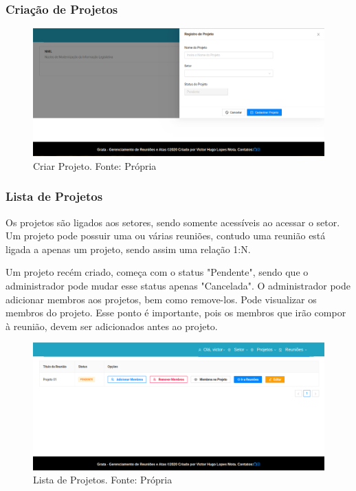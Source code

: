 \subsubsection{Criação de Projetos}

\begin{figure}[H]
    \centering
    \includegraphics[width=1.0\textwidth]{figuras/criar_projeto.png}
    \caption{Criar Projeto. Fonte: Própria}
    \label{img:criacao_de_projeto}
\end{figure}

\subsubsection{Lista de Projetos}

Os projetos são ligados aos setores, sendo somente acessíveis ao acessar o setor. Um projeto pode possuir uma ou várias reuniões, contudo uma reunião está ligada a apenas um projeto, sendo assim uma relação 1:N.

Um projeto recém criado, começa com o status "Pendente", sendo que o administrador pode mudar esse status apenas "Cancelada". O administrador pode adicionar membros aos projetos, bem como remove-los. Pode visualizar os membros do projeto. Esse ponto é importante, pois os membros que irão compor à reunião, devem ser adicionados antes ao projeto.

\begin{figure}[H]
    \centering
    \includegraphics[width=1.0\textwidth]{figuras/lista_de_projetos.png}
    \caption{Lista de Projetos. Fonte: Própria}
    \label{img:lista_de_projetos}
\end{figure}

